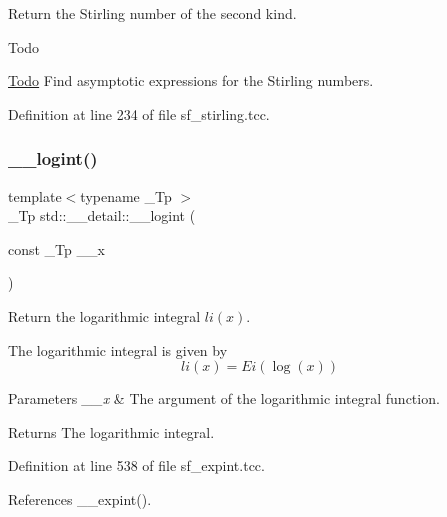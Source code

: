 Return the Stirling number of the second kind.

\begin{DoxyRefDesc}{Todo}
\item[\hyperlink{todo__todo000014}{Todo}]Find asymptotic expressions for the Stirling numbers. \end{DoxyRefDesc}


Definition at line 234 of file sf\+\_\+stirling.\+tcc.

\mbox{\label{namespacestd_1_1____detail_a4d5f8cb2b4e6e192faba9418ec14149f}} 
\subsubsection{\texorpdfstring{\+\_\+\+\_\+logint()}{\_\_logint()}}
{\footnotesize\ttfamily template$<$typename \+\_\+\+Tp $>$ \\
\+\_\+\+Tp std\+::\+\_\+\+\_\+detail\+::\+\_\+\+\_\+logint (\begin{DoxyParamCaption}\item[{const \+\_\+\+Tp}]{\+\_\+\+\_\+x }\end{DoxyParamCaption})}



Return the logarithmic integral $ li(x) $. 

The logarithmic integral is given by \[ li(x) = Ei(\log(x)) \]


\begin{DoxyParams}{Parameters}
{\em \+\_\+\+\_\+x} & The argument of the logarithmic integral function. \\
\hline
\end{DoxyParams}
\begin{DoxyReturn}{Returns}
The logarithmic integral. 
\end{DoxyReturn}


Definition at line 538 of file sf\+\_\+expint.\+tcc.



References \+\_\+\+\_\+expint().

\mbox{\label{namespacestd_1_1____detail_a2ee185d74e39b87c74c3c428f8e73ee7}} 
